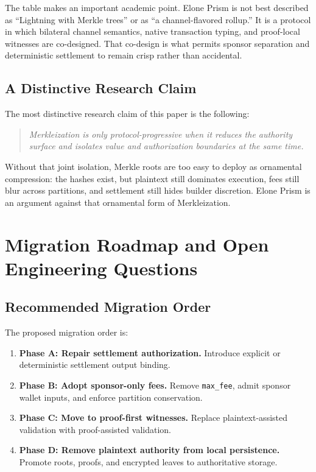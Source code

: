 \documentclass[11pt,a4paper]{article}
\newcommand{\code}[1]{\texttt{#1}}
\begin{document}
The table makes an important academic point. Elone Prism is not best described as ``Lightning with Merkle trees'' or as ``a channel-flavored rollup.'' It is a protocol in which bilateral channel semantics, native transaction typing, and proof-local witnesses are co-designed. That co-design is what permits sponsor separation and deterministic settlement to remain crisp rather than accidental.

\subsection{A Distinctive Research Claim}

The most distinctive research claim of this paper is the following:
\begin{quote}
\textit{Merkleization is only protocol-progressive when it reduces the authority surface and isolates value and authorization boundaries at the same time.}
\end{quote}

Without that joint isolation, Merkle roots are too easy to deploy as ornamental compression: the hashes exist, but plaintext still dominates execution, fees still blur across partitions, and settlement still hides builder discretion. Elone Prism is an argument against that ornamental form of Merkleization.

\section{Migration Roadmap and Open Engineering Questions}

\subsection{Recommended Migration Order}

The proposed migration order is:
\begin{enumerate}
    \item \textbf{Phase A: Repair settlement authorization.}
    Introduce explicit or deterministic settlement output binding.
    \item \textbf{Phase B: Adopt sponsor-only fees.}
    Remove \code{max\_fee}, admit sponsor wallet inputs, and enforce partition conservation.
    \item \textbf{Phase C: Move to proof-first witnesses.}
    Replace plaintext-assisted validation with proof-assisted validation.
    \item \textbf{Phase D: Remove plaintext authority from local persistence.}
    Promote roots, proofs, and encrypted leaves to authoritative storage.
\end{enumerate}
\end{document}
